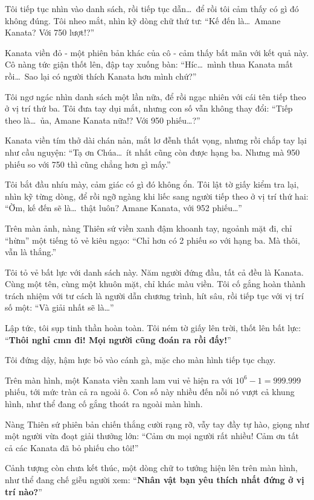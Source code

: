 \documentclass[../main.tex]{subfiles}
\begin{document}
Tôi tiếp tục nhìn vào danh sách, rồi tiếp tục dẫn\dots\ để rồi tôi cảm thấy có gì đó không đúng. Tôi nheo mắt, nhìn kỹ dòng chữ thứ tư: ``Kế đến là\dots\ Amane Kanata? Với 750 lượt!?''

Kanata viền đỏ - một phiên bản khác của cô - cảm thấy bất mãn với kết quả này. Cô nàng tức giận thốt lên, đập tay xuống bàn: ``Híc\dots\ mình thua Kanata mất rồi\dots\ Sao lại có người thích Kanata hơn mình chứ?''

Tôi ngơ ngác nhìn danh sách một lần nữa, để rồi ngạc nhiên với cái tên tiếp theo ở vị trí thứ ba. Tôi đưa tay dụi mắt, nhưng con số vẫn không thay đổi: ``Tiếp theo là\dots\ ủa, Amane Kanata nữa!? Với 950 phiếu\dots?''

Kanata viền tím thở dài chán nản, mắt lơ đễnh thất vọng, nhưng rồi chắp tay lại như cầu nguyện: ``Tạ ơn Chúa\dots\ ít nhất cũng còn được hạng ba. Nhưng mà 950 phiếu so với 750 thì cũng chẳng hơn gì mấy.''

Tôi bắt đầu nhíu mày, cảm giác có gì đó không ổn. Tôi lật tờ giấy kiểm tra lại, nhìn kỹ từng dòng, để rồi ngỡ ngàng khi liếc sang người tiếp theo ở vị trí thứ hai: ``Ờm, kế đến sẽ là\dots\ thật luôn? Amane Kanata, với 952 phiếu\dots''

Trên màn ảnh, nàng Thiên sứ viền xanh đậm khoanh tay, ngoảnh mặt đi, chỉ ``hừm'' một tiếng tỏ vẻ kiêu ngạo: ``Chỉ hơn có 2 phiếu so với hạng ba. Mà thôi, vẫn là thắng.''

Tôi tỏ vẻ bất lực với danh sách này. Năm người đứng đầu, tất cả đều là Kanata. Cùng một tên, cùng một khuôn mặt, chỉ khác màu viền. Tôi cố gắng hoàn thành trách nhiệm với tư cách là người dẫn chương trình, hít sâu, rồi tiếp tục với vị trí số một: ``Và giải nhất sẽ là\dots''

Lập tức, tôi sụp tinh thần hoàn toàn. Tôi ném tờ giấy lên trời, thốt lên bất lực: ``\textbf{Thôi nghỉ cmn đi! Mọi người cũng đoán ra rồi đấy!}''

Tôi đứng dậy, hậm hực bỏ vào cánh gà, mặc cho màn hình tiếp tục chạy.

Trên màn hình, một Kanata viền xanh lam vui vẻ hiện ra với \(10^6-1=999.999\) phiếu, tới mức tràn cả ra ngoài ô. Con số này nhiều đến nỗi nó vượt cả khung hình, như thể đang cố gắng thoát ra ngoài màn hình.

Nàng Thiên sứ phiên bản chiến thắng cười rạng rỡ, vẫy tay đầy tự hào, giọng như một người vừa đoạt giải thưởng lớn: ``Cảm ơn mọi người rất nhiều! Cảm ơn tất cả các Kanata đã bỏ phiếu cho tôi!''

Cảnh tượng còn chưa kết thúc, một dòng chữ to tướng hiện lên trên màn hình, như thể đang chế giễu người xem: ``\textbf{Nhân vật bạn yêu thích nhất đứng ở vị trí nào?}''
\end{document}

